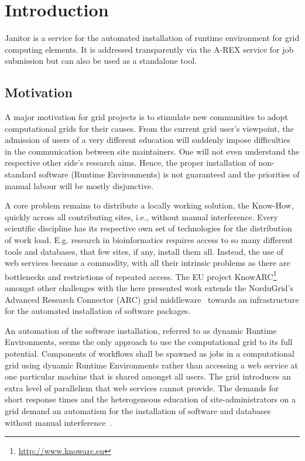 \chapter{Introduction}

Janitor is a service for the automated installation of runtime environment for grid computing elements.
It is addressed transparently via the A-REX service for job submission but can also be used as a standalone tool.

\section{Motivation}

A major motivation for grid projects is to stimulate new communities to adopt computational grids for their
causes. From the current grid user's viewpoint, the admission of users of a very different education will
suddenly impose difficulties in the communication between site maintainers. One will not even understand
the respective other side's research aims. Hence, the proper installation of non-standard software (Runtime
Environments) is not guaranteed and the priorities of manual labour will be mostly disjunctive.

A core problem remains to distribute a locally working solution, the Know-How, quickly across all
contributing sites, i.e., without manual interference. Every scientific discipline has its respective own set of
technologies for the distribution of work load. E.g. research in bioinformatics requires access to so many
different tools and databases, that few sites, if any, install them all. Instead, the use of web services became
a commodity, with all their intrinsic problems as there are bottlenecks and restrictions of repeated access.
The EU project KnowARC\footnote{\href{http://www.knowarc.eu}{http://www.knowarc.eu}} amongst other challenges
with the here presented work extends the NorduGrid's
Advanced Research Connector (ARC) grid middleware~\cite{ELLERT_2007} towards an infrastructure for the
automated installation of software packages.

An automation of the software installation, referred to as dynamic Runtime Environments, seems the only
approach to use the computational grid to its full potential. Components of workflows shall be spawned
as jobs in a computational grid using dynamic Runtime Environments rather than accessing a web service
at one particular machine that is shared amongst all users.
The grid introduces an extra level of parallelism that web services cannot provide. The demands for short
response times and the heterogeneous education of site-administrators on a grid demand an automatism for
the installation of software and databases without manual interference~\cite{BAYER_2007}.

